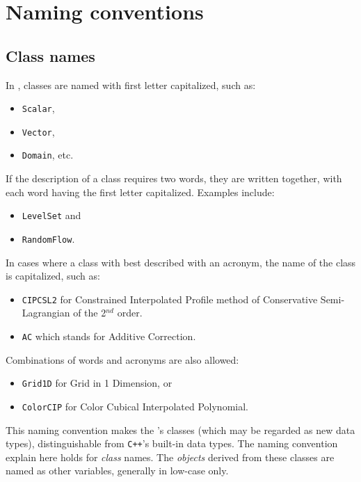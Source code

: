 \section{Naming conventions}
\label{sec:naming_conventions}

\subsection{Class names}

In {\psiboil}, classes are named with first letter capitalized, such as:
\begin{itemize}
  \item {\tt Scalar}, 
  \item {\tt Vector}, 
  \item {\tt Domain}, etc. 
\end{itemize}

If the description of a class requires two words, they are written together,
with each word having the first letter capitalized. Examples include:
\begin{itemize}
  \item {\tt LevelSet} and 
  \item {\tt RandomFlow}. 
\end{itemize}

In cases where a class with best described with an acronym, the name of the
class is capitalized, such as:
\begin{itemize}
  \item {\tt CIPCSL2} for Constrained Interpolated Profile method of Conservative 
        Semi-Lagrangian of the 2$^{nd}$ order.
  \item {\tt AC} which stands for Additive Correction.
\end{itemize}

Combinations of words and acronyms are also allowed:
\begin{itemize}
  \item {\tt Grid1D} for Grid in 1 Dimension, or             
  \item {\tt ColorCIP} for Color Cubical Interpolated Polynomial.
\end{itemize}

This naming convention makes the {\psiboil}'s classes (which may be regarded as
new data types), distinguishable from {\tt C++}'s built-in data types.
%
The naming convention explain here holds for {\em class} names. 
The {\em objects} derived from these classes are named as other variables, 
generally in low-case only.

